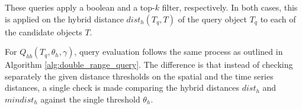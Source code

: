 %
%
%




\label{subsubsec:hybrid_range_query}

These queries apply a boolean and a top-$k$ filter, respectively. In both cases, this is applied on the hybrid distance $dist_h(T_q, T)$ of the query object $T_q$ to each of the candidate objects $T$.

For $Q_{hb}(T_q, \theta_h, \gamma)$, query evaluation follows the same process as outlined in Algorithm \ref{alg:double_range_query}. The difference is that instead of checking separately the given distance thresholds on the spatial and the time series distances, a single check is made comparing the hybrid distances $dist_h$ and $mindist_h$ against the single threshold $\theta_h$.

